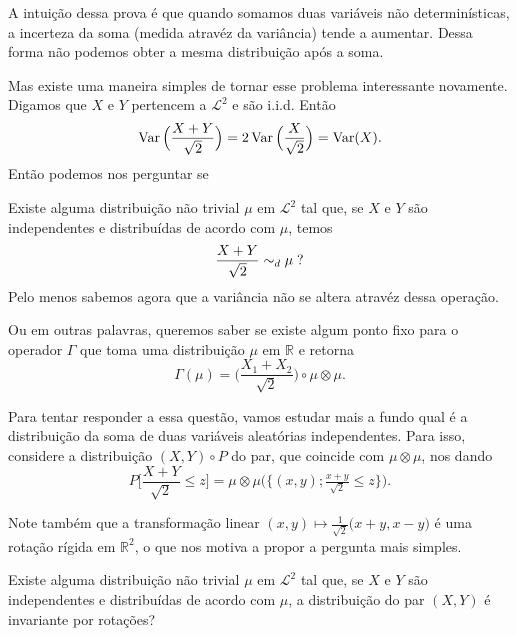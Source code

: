 A intuição dessa prova é que quando somamos duas variáveis não determinísticas, a incerteza da soma (medida atravéz da variância) tende a aumentar.
Dessa forma não podemos obter a mesma distribuição após a soma.

Mas existe uma maneira simples de tornar esse problema interessante novamente.
Digamos que $X$ e $Y$ pertencem a $\mathcal{L}^2$ e são i.i.d.
Então
\begin{equation}
  \operatorname{Var}\Big(\frac{X + Y}{\sqrt{2}}\Big) = 2 \operatorname{Var}\Big( \frac X{\sqrt{2}} \Big) = \operatorname{Var}(X).
\end{equation}
Então podemos nos perguntar se

\begin{question}
  \label{q:ponto_fixo_soma}
  Existe alguma distribuição não trivial $\mu$ em $\mathcal{L}^2$ tal que, se $X$ e $Y$ são independentes e distribuídas de acordo com $\mu$, temos
  \begin{equation}
    \frac{X + Y}{\sqrt{2}} \sim_d \mu \; ?
  \end{equation}
  Pelo menos sabemos agora que a variância não se altera atravéz dessa operação.
\end{question}

Ou em outras palavras, queremos saber se existe algum ponto fixo para o operador $\Gamma$ que toma uma distribuição $\mu$ em $\mathbb{R}$ e retorna
\begin{equation}
  \label{e:Gamma_operador}
  \Gamma(\mu) = \Big( \frac{X_1 + X_2}{\sqrt{2}} \Big) \circ \mu \otimes \mu.
\end{equation}


Para tentar responder a essa questão, vamos estudar mais a fundo qual é a distribuição da soma de duas variáveis aleatórias independentes.
Para isso, considere a distribuição $(X,Y) \circ P$ do par, que coincide com $\mu \otimes \mu$, nos dando
\begin{equation}
  P\Big[ \frac{X + Y}{\sqrt{2}} \leq z \Big] = \mu \otimes \mu \big( \big\{(x, y); \tfrac{x + y}{\sqrt{2}} \leq z \big\} \big).
\end{equation}

Note também que a transformação linear $(x,y) \mapsto \tfrac{1}{\sqrt{2}}\big(x + y, x - y\big)$ é uma rotação rígida em $\mathbb{R}^2$, o que nos motiva a propor a pergunta mais simples.

\begin{question}
  Existe alguma distribuição não trivial $\mu$ em $\mathcal{L}^2$ tal que, se $X$ e $Y$ são independentes e distribuídas de acordo com $\mu$, a distribuição do par $(X,Y)$ é invariante por rotações?
\end{question}

